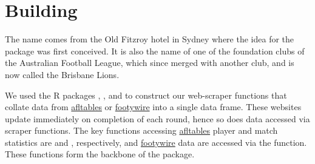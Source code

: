 \section{Building }

The name  comes from  the Old Fitzroy hotel in Sydney where the idea for the package was first conceived. It is also the name of one of the foundation clubs of the Australian Football League, which since merged with another club, and is now called the Brisbane Lions.

We used the R packages  \citep{Rvest},  \citep{dplyr},  \citep{purrr} and  \citep{xml} to construct our web-scraper functions that collate data from \href{https://afltables.com/afl/afl_index.html}{afltables} or \href{https://www.footywire.com}{footywire} into a single data frame. These websites update immediately on completion of each round, hence so does data accessed via  scraper functions. The key functions accessing \href{https://afltables.com/afl/afl_index.html}{afltables} player and match statistics are  and , respectively, and \href{https://www.footywire.com}{footywire} data are accessed via the  function. These functions form the backbone of the package.

